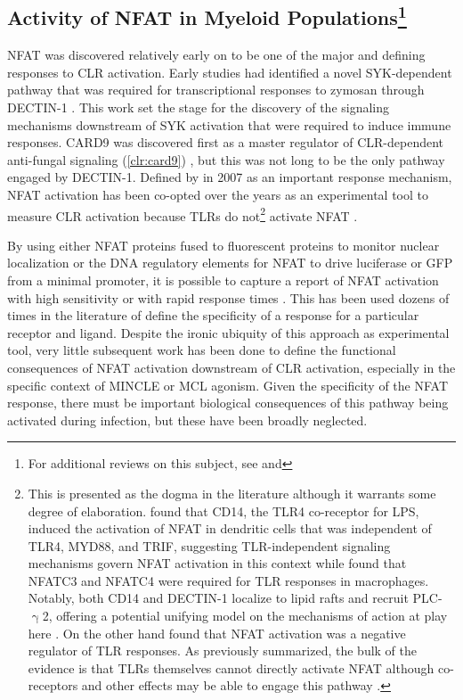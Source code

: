 \subsection[Activity of NFAT in Myeloid Populations]{Activity of NFAT in Myeloid Populations\footnote{For additional reviews on this subject, see  and }}\label{myeloidnfat}

NFAT was discovered relatively early on to be one of the major and defining responses to CLR activation. Early studies had identified a novel SYK\hyp{}dependent pathway that was required for transcriptional responses to zymosan through DECTIN\hyp{}1 \citep{Rogers2005}. This work set the stage for the discovery of the signaling mechanisms downstream of SYK activation that were required to induce immune responses. CARD9 was discovered first as a master regulator of CLR\hyp{}dependent anti\hyp{}fungal signaling (\autoref{clr:card9}) \citep{Gross2006, Hara2007}, but this was not long to be the only pathway engaged by DECTIN\hyp{}1. Defined by \citeauthor{Goodridge2007} in 2007 as an important response mechanism, NFAT activation has been co\hyp{}opted over the years as an experimental tool to measure CLR activation because TLRs do not\footnote{This is presented as the dogma in the literature although it warrants some degree of elaboration. \citeauthor{Zanoni2009} found that CD14, the TLR4 co\hyp{}receptor for LPS, induced the activation of NFAT in dendritic cells that was independent of TLR4, MYD88, and TRIF, suggesting TLR\hyp{}independent signaling mechanisms govern NFAT activation in this context while \citeauthor{Minematsu2011} found that NFATC3 and NFATC4 were required for TLR responses in macrophages. Notably, both CD14 and DECTIN\hyp{}1 localize to lipid rafts and recruit PLC\hyp{}$\upgamma$2, offering a potential unifying model on the mechanisms of action at play here \citep{Xu2009b}. On the other hand \citeauthor{Kang2007} found that NFAT activation was a negative regulator of TLR responses. As previously summarized, the bulk of the evidence is that TLRs themselves cannot directly activate NFAT although co\hyp{}receptors and other effects may be able to engage this pathway \citep{Zanoni2012}.} activate NFAT \citep{Yamasaki2009, Richardson2014, Ishikawa2013, Furukawa2013, Hattori2014}. 

By using either NFAT proteins fused to fluorescent proteins to monitor nuclear localization or the DNA regulatory elements for NFAT to drive luciferase or GFP from a minimal promoter, it is possible to capture a report of NFAT activation with high sensitivity or with rapid response times \citep{Colella2008, Gwack2006, Kar2015, Kar2016, Jauliac2002, Wilkins2004, Chow1999, Aramburu1998}. This has been used dozens of times in the literature of define the specificity of a response for a particular receptor and ligand. Despite the ironic ubiquity of this approach as experimental tool, very little subsequent work has been done to define the functional consequences of NFAT activation downstream of CLR activation, especially in the specific context of MINCLE or MCL agonism. Given the specificity of the NFAT response, there must be important biological consequences of this pathway being activated during infection, but these have been broadly neglected. 

